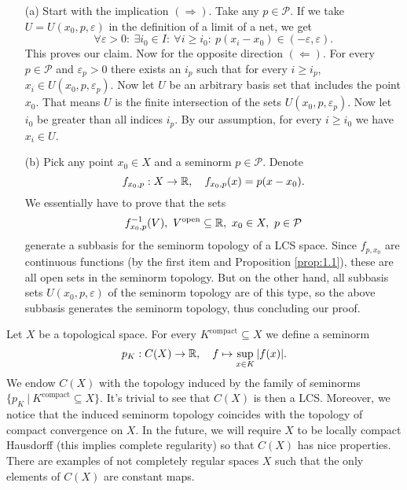 \begin{myproof}
    \begin{itemize}
      \item[(a)] Start with the implication $(\Rightarrow)$. Take any $p \in \mathcal{P}$.
      If we take $U = U(x_0, p, \varepsilon)$ in the definition of a limit of a net, we get 
      $$\forall \varepsilon > 0:\ \exists i_0 \in I:\ \forall i \geq i_0:\ p(x_i - x_0) \in (-\varepsilon, \varepsilon).$$
      This proves our claim. Now for the opposite direction $(\Leftarrow)$. For every $p \in \mathcal{P}$ and 
      $\varepsilon_p > 0$ there exists an $i_p$ such that for every $i \geq i_p$, $x_i \in U(x_0, p, \varepsilon_p)$.
      Now let $U$ be an arbitrary basis set that includes the point $x_0$. That means $U$ is the finite intersection of the sets 
      $U(x_0, p, \varepsilon_p)$. Now let $i_0$ be greater than all indices $i_p$. By our assumption, 
      for every $i \geq i_0$ we have $x_i \in U$.
      \item[(b)] Pick any point $x_0 \in X$ and a seminorm $p \in \mathcal{P}$. Denote $$f_{x_0, p}: X \to \mathbb {R},\quad f_{x_0, p}(x) = p(x - x_0).$$
      We essentially have to prove that the sets
      $$f_{x_0, p}^{-1} (V),\ V^{\textrm{open}} \subseteq \mathbb {R},\ x_0 \in X,\ p \in \mathcal{P}$$
      generate a subbasis for the seminorm topology of a LCS space.
      Since $f_{p, x_0}$ are continuous functions (by the first item and Proposition \ref{prop:1.1}),
      these are all open sets in the seminorm topology. But on the other hand, all subbasis sets $U(x_0, p, \varepsilon)$
      of the seminorm topology are of this type, so the above subbasis generates the seminorm topology, thus concluding our proof. \qedhere
    \end{itemize}
\end{myproof}

\begin{example}\label{ex:1.3}
    Let $X$ be a topological space.
        For every $K^\textrm{compact} \subseteq X$ we define a seminorm 
        $$p_K: C (X) \to \mathbb {R},\quad f \mapsto \sup_{x \in K} |f(x)|.$$
        We endow $C (X)$ with the topology induced by the family of seminorms $\{p_K\ |\ K^{\textrm{compact}} \subseteq X\}$. 
        It's trivial to see that $C(X)$ is then a LCS. Moreover, we notice that the induced seminorm topology
        coincides with the topology of compact convergence on $X$. In the future, we will require $X$ to be locally compact Hausdorff (this implies complete regularity)
        so that $C(X)$ has nice properties.
        There are examples of not completely regular spaces $X$ such that the only elements of $C(X)$ are constant maps.
\end{example}


